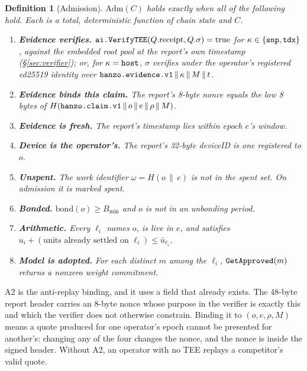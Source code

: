 \documentclass[11pt,a4paper]{article}
\newtheorem{definition}{Definition}[section]
\newcommand{\code}[1]{\texttt{\hyphenchar\font=`\-\relax #1}}
\newcommand{\Adm}{\mathrm{Adm}}
\newcommand{\bond}{\mathrm{bond}}
\begin{document}
\begin{definition}[Admission]
\label{def:adm}
$\Adm(C)$ holds exactly when all of the following hold. Each is a total,
deterministic function of chain state and $C$.

\begin{enumerate}[label=A\arabic*.,leftmargin=2.4em]
  \item \textbf{Evidence verifies.}
    $\code{ai.VerifyTEE}(Q.\text{receipt}, Q.\sigma) = \text{true}$ for
    $\kappa \in \{\code{snp}, \code{tdx}\}$, against the embedded root pool at
    the report's own timestamp (§\ref{sec:verifier}); or, for
    $\kappa = \code{host}$, $\sigma$ verifies under the operator's registered
    ed25519 identity over
    $\code{hanzo.evidence.v1} \,\|\, \kappa \,\|\, M \,\|\, t$.
  \item \textbf{Evidence binds this claim.} The report's 8-byte nonce equals the
    low 8 bytes of
    $H(\code{hanzo.claim.v1} \,\|\, o \,\|\, e \,\|\, \rho \,\|\, M)$.
  \item \textbf{Evidence is fresh.} The report's timestamp lies within epoch
    $e$'s window.
  \item \textbf{Device is the operator's.} The report's 32-byte deviceID is one
    registered to $o$.
  \item \textbf{Unspent.} The work identifier $\omega = H(o \,\|\, e)$ is not in
    the spent set. On admission it is marked spent.
  \item \textbf{Bonded.} $\bond(o) \ge B_{\min}$ and $o$ is not in an unbonding
    period.
  \item \textbf{Arithmetic.} Every $\ell_i$ names $o$, is live in $e$, and
    satisfies $u_i + (\text{units already settled on } \ell_i) \le \bar u_{\ell_i}$.
  \item \textbf{Model is adopted.} For each distinct $m$ among the $\ell_i$,
    $\code{GetApproved}(m)$ returns a nonzero weight commitment.
\end{enumerate}
\end{definition}

A2 is the anti-replay binding, and it uses a field that already exists. The
48-byte report header carries an 8-byte nonce whose purpose in the verifier is
exactly this and which the verifier does not otherwise constrain. Binding it to
$(o, e, \rho, M)$ means a quote produced for one operator's epoch cannot be
presented for another's: changing any of the four changes the nonce, and the
nonce is inside the signed header. Without A2, an operator with no TEE replays a
competitor's valid quote.
\end{document}
